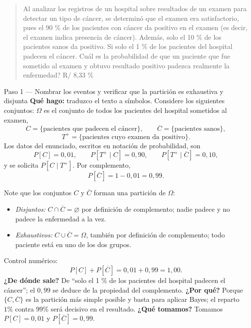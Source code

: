 \documentclass[11pt]{article}
\begin{document}
\begin{quote}
Al analizar los registros de un hospital sobre resultados de un examen para detectar un tipo de c\'ancer, se determin\'o que el examen era satisfactorio, pues el 90 \% de los pacientes con c\'ancer da positivo en el examen (es decir, el examen indica presencia de c\'ancer). Adem\'as, solo el 10 \% de los pacientes sanos da positivo. Si solo el 1 \% de los pacientes del hospital padecen el c\'ancer. Cu\'al es la probabilidad de que un paciente que fue sometido al examen y obtuvo resultado positivo padezca realmente la enfermedad? \hfill R/ 8,33 \%
\end{quote}

\begin{sol}

\begin{paso}{Paso 1 --- Nombrar los eventos y verificar que la partici\'on es exhaustiva y disjunta}
\textbf{Qu\'e hago:} traduzco el texto a s\'imbolos. Considere los siguientes conjuntos: $\Omega$ es el conjunto de todos los pacientes del hospital sometidos al examen,
\[
C=\{\text{pacientes que padecen el c\'ancer}\},\qquad
\overline{C}=\{\text{pacientes sanos}\},
\]
\[
T^{+}=\{\text{pacientes cuyo examen da positivo}\}.
\]
Los datos del enunciado, escritos en notaci\'on de probabilidad, son
\[
P[C]=0{,}01,\qquad P[T^{+}\mid C]=0{,}90,\qquad P[T^{+}\mid\overline{C}]=0{,}10 ,
\]
y se solicita $P[C\mid T^{+}]$. Por complemento,
\[
P[\overline{C}]=1-0{,}01=0{,}99 .
\]

\medskip
Note que los conjuntos $C$ y $\overline{C}$ forman una partici\'on de $\Omega$:
\begin{itemize}[leftmargin=1.4em]
\item \emph{Disjuntos:} $C\cap\overline{C}=\varnothing$ por definici\'on de complemento; nadie padece y no padece la enfermedad a la vez.
\item \emph{Exhaustivos:} $C\cup\overline{C}=\Omega$, tambi\'en por definici\'on de complemento; todo paciente est\'a en uno de los dos grupos.
\end{itemize}
Control num\'erico:
\[
P[C]+P[\overline{C}]=0{,}01+0{,}99=1{,}00 .
\]
\textbf{¿De d\'onde sale?} De ``solo el 1 \% de los pacientes del hospital padecen el c\'ancer''; el $0{,}99$ se deduce de la propiedad del complemento.
\textbf{¿Por qu\'e?} Porque $\{C,\overline{C}\}$ es la partici\'on m\'as simple posible y basta para aplicar Bayes; el reparto $1\%$ contra $99\%$ ser\'a decisivo en el resultado.
\textbf{¿Qu\'e tomamos?} Tomamos $P[C]=0{,}01$ y $P[\overline{C}]=0{,}99$.
\end{paso}


\end{sol}
\end{document}
